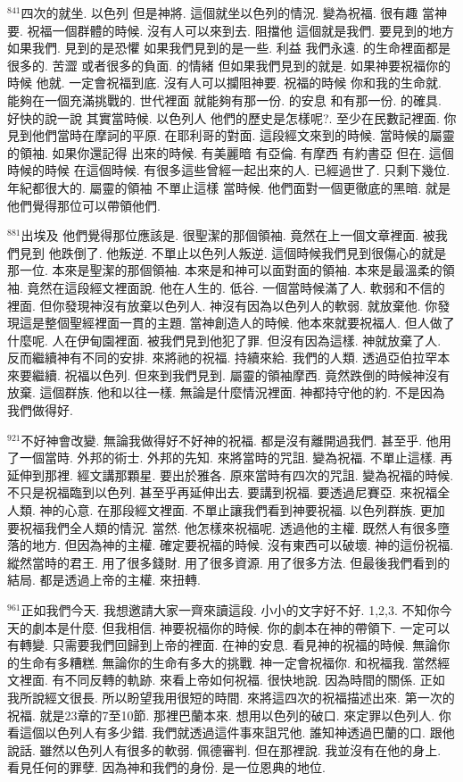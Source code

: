 \documentclass{book}
\begin{document}
$^{841}$四次的就坐.
以色列 但是神將.
這個就坐以色列的情況.
變為祝福.
很有趣 當神要.
祝福一個群體的時候.
沒有人可以來到去.
阻擋他 這個就是我們.
要見到的地方 如果我們.
見到的是恐懼 如果我們見到的是一些.
利益 我們永遠.
的生命裡面都是很多的.
苦澀 或者很多的負面.
的情緒 但如果我們見到的就是.
如果神要祝福你的時候 他就.
一定會祝福到底.
沒有人可以攔阻神要.
祝福的時候 你和我的生命就.
能夠在一個充滿挑戰的.
世代裡面 就能夠有那一份.
的安息 和有那一份.
的確具.
好快的說一說 其實當時候.
以色列人 他們的歷史是怎樣呢?.
至少在民數記裡面.
你見到他們當時在摩訶的平原.
在耶利哥的對面.
這段經文來到的時候.
當時候的屬靈的領袖.
如果你還記得 出來的時候.
有美麗暗 有亞倫.
有摩西 有約書亞 但在.
這個時候的時候 在這個時候.
有很多這些曾經一起出來的人.
已經過世了.
只剩下幾位.
年紀都很大的.
屬靈的領袖 不單止這樣 當時候.
他們面對一個更徹底的黑暗.
就是他們覺得那位可以帶領他們.

$^{881}$出埃及 他們覺得那位應該是.
很聖潔的那個領袖.
竟然在上一個文章裡面.
被我們見到 他跌倒了.
他叛逆.
不單止以色列人叛逆.
這個時候我們見到很傷心的就是那一位.
本來是聖潔的那個領袖.
本來是和神可以面對面的領袖.
本來是最溫柔的領袖.
竟然在這段經文裡面說.
他在人生的.
低谷.
一個當時候滿了人.
軟弱和不信的裡面.
但你發現神沒有放棄以色列人.
神沒有因為以色列人的軟弱.
就放棄他.
你發現這是整個聖經裡面一貫的主題.
當神創造人的時候.
他本來就要祝福人.
但人做了什麼呢.
人在伊甸園裡面.
被我們見到他犯了罪.
但沒有因為這樣.
神就放棄了人.
反而繼續神有不同的安排.
來將祂的祝福.
持續來給.
我們的人類.
透過亞伯拉罕本來要繼續.
祝福以色列.
但來到我們見到.
屬靈的領袖摩西.
竟然跌倒的時候神沒有放棄.
這個群族.
他和以往一樣.
無論是什麼情況裡面.
神都持守他的約.
不是因為我們做得好.

$^{921}$不好神會改變.
無論我做得好不好神的祝福.
都是沒有離開過我們.
甚至乎.
他用了一個當時.
外邦的術士.
外邦的先知.
來將當時的咒詛.
變為祝福.
不單止這樣.
再延伸到那裡.
經文講那顆星.
要出於雅各.
原來當時有四次的咒詛.
變為祝福的時候.
不只是祝福臨到以色列.
甚至乎再延伸出去.
要講到祝福.
要透過尼賽亞.
來祝福全人類.
神的心意.
在那段經文裡面.
不單止讓我們看到神要祝福.
以色列群族.
更加要祝福我們全人類的情況.
當然.
他怎樣來祝福呢.
透過他的主權.
既然人有很多墮落的地方.
但因為神的主權.
確定要祝福的時候.
沒有東西可以破壞.
神的這份祝福.
縱然當時的君王.
用了很多錢財.
用了很多資源.
用了很多方法.
但最後我們看到的結局.
都是透過上帝的主權.
來扭轉.

$^{961}$正如我們今天.
我想邀請大家一齊來讀這段.
小小的文字好不好.
1,2,3.
不知你今天的劇本是什麼.
但我相信.
神要祝福你的時候.
你的劇本在神的帶領下.
一定可以有轉變.
只需要我們回歸到上帝的裡面.
在神的安息.
看見神的祝福的時候.
無論你的生命有多糟糕.
無論你的生命有多大的挑戰.
神一定會祝福你.
和祝福我.
當然經文裡面.
有不同反轉的軌跡.
來看上帝如何祝福.
很快地說.
因為時間的關係.
正如我所說經文很長.
所以盼望我用很短的時間.
來將這四次的祝福描述出來.
第一次的祝福.
就是23章的7至10節.
那裡巴蘭本來.
想用以色列的破口.
來定罪以色列人.
你看這個以色列人有多少錯.
我們就透過這件事來詛咒他.
誰知神透過巴蘭的口.
跟他說話.
雖然以色列人有很多的軟弱.
佩德審判.
但在那裡說.
我並沒有在他的身上.
看見任何的罪孽.
因為神和我們的身份.
是一位恩典的地位.
\end{document}
